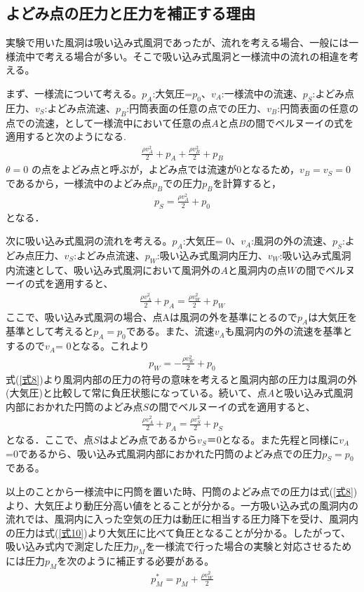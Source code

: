 \documentclass[a4paper,11pt,uplatex]{jsarticle}
\begin{document}
\subsection{よどみ点の圧力と圧力を補正する理由}
実験で用いた風洞は吸い込み式風洞であったが、流れを考える場合、一般には一様流中で考える場合が多い。そこで吸い込み式風洞と一様流中の流れの相違を考える。
\par
まず、一様流について考える。$p_A$:大気圧=$p_0$、$v_A$:一様流中の流速、$p_S$:よどみ点圧力、$v_S$:よどみ点流速、$p_B$:円筒表面の任意の点での圧力、$v_B$:円筒表面の任意の点での流速，として一様流中において任意の点$A$と点$B$の間でベルヌーイの式を適用すると次のようになる.
\begin{align}
  \frac{\rho v^{2}_A}{2} + p_A + \frac{\rho v^{2}_B}{2} + p_B
\end{align}
$\theta =0$ の点をよどみ点と呼ぶが，よどみ点では流速が0となるため，$v_B = v_S = 0$であるから，一様流中のよどみ点$p_B$での圧力$p_B$を計算すると，
\begin{align}
  \label{式8}
  p_S = \frac{\rho v^{2}_{A}}{2} + p_0
\end{align}
となる．
\par
次に吸い込み式風洞の流れを考える。$p_A$:大気圧= 0、$v_A$:風洞の外の流速、$p_S$:よどみ点圧力、$v_S$:よどみ点流速、$p_W$:吸い込み式風洞内圧力、$v_W$:吸い込み式風洞内流速として、吸い込み式風洞において風洞外の$A$と風洞内の点$W$の間でベルヌーイの式を適用すると、
\begin{align}
  \frac{\rho v^{2}_A}{2} + p_A = \frac{\rho v^{2}_W}{2} + p_W
\end{align}
ここで、吸い込み式風洞の場合、点Aは風洞の外を基準にとるので$p_A$は大気圧を基準として考えると$p_A=p_0$である。また、流速$v_A$も風洞内の外の流速を基準とするので$v_A$= 0となる。これより
\begin{align}
  \label{式10}
  p_W = - \frac{\rho v^{2}_W}{2} + p_0
\end{align}
式(\ref{式8})より風洞内部の圧力の符号の意味を考えると風洞内部の圧力は風洞の外(大気圧)と比較して常に負圧状態になっている。続いて、点$A$と吸い込み式風洞内部におかれた円筒のよどみ点$S$の間でベルヌーイの式を適用すると、
\begin{align}
  \frac{\rho  v^{2}_A}{2} + p_A = \frac{\rho v^{2}_S}{2} + p_S
\end{align}
となる．ここで、点$S$はよどみ点であるから$v_S$＝0となる。また先程と同様に$v_A$=0であるから、吸い込み式風洞内部におかれた円筒のよどみ点での圧力$p_S = p_0$である。
\par
以上のことから一様流中に円筒を置いた時、円筒のよどみ点での圧力は式(\ref{式8})より、大気圧より動圧分高い値をとることが分かる。一方吸い込み式の風洞内の流れでは、風洞内に入った空気の圧力は動圧に相当する圧力降下を受け、風洞内の圧力は式(\ref{式10})より大気圧に比べて負圧となることが分かる。したがって、吸い込み式内で測定した圧力$p_M$を一様流で行った場合の実験と対応させるためには圧力$p_M$を次のように補正する必要がある。
\begin{align}
  p_{M}^{\ast} = p_M + \frac{\rho v^{2}_W}{2}
\end{align}
\end{document}
